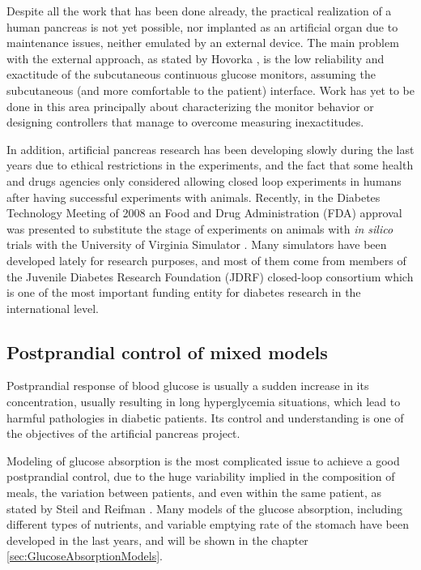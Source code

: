 Despite all the work that has been done already, the practical realization of a human pancreas is not yet possible, nor implanted as an artificial organ due to maintenance issues, neither emulated by an external device. The main problem with the external approach, as stated by Hovorka \cite{hovorka2006continuous}, is the low reliability and exactitude of the subcutaneous continuous glucose monitors, assuming the subcutaneous (and more comfortable to the patient) interface. Work has yet to be done in this area principally about characterizing the monitor behavior or designing controllers that manage to overcome measuring inexactitudes.

In addition, artificial pancreas research has been developing slowly during the last years due to ethical restrictions in the experiments, and the fact that some health and drugs agencies only considered allowing closed loop experiments in humans after having successful experiments with animals. Recently, in the Diabetes Technology Meeting of 2008 \cite{DTM2008} an Food and Drug Administration (FDA) \cite{FDA} approval was presented to substitute the stage of experiments on animals with \textit{in silico} trials with the University of Virginia Simulator \cite{kovatchev2009biosimulation}. Many simulators have been developed lately for research purposes, and most of them come from members of the Juvenile Diabetes Research Foundation (JDRF) \cite{JDRF} closed-loop consortium which is one of the most important funding entity for diabetes research in the international level.

\subsection{Postprandial control of mixed models}
\label{sec:Postprandialcontrolofmixesmodels}

Postprandial response of blood glucose is usually a sudden increase in its concentration, usually resulting in long hyperglycemia situations, which lead to harmful pathologies in diabetic patients. Its control and understanding is one of the objectives of the artificial pancreas project.

Modeling of glucose absorption is the most complicated issue to achieve a good postprandial control, due to the huge variability implied in the composition of meals, the variation between patients, and even within the same patient, as stated by Steil and Reifman \cite{DTM2008}. Many models of the glucose absorption, including different types of nutrients, and variable emptying rate of the stomach have been developed in the last years, and will be shown in the chapter \ref{sec:GlucoseAbsorptionModels}.

